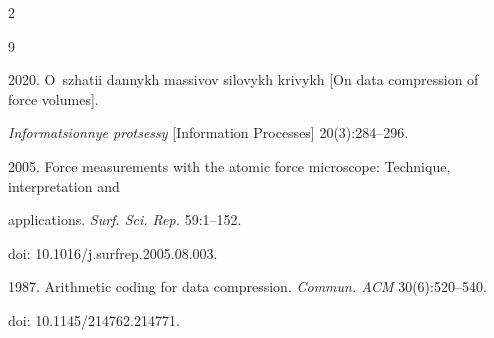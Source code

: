 















  \begin{multicols}{2}



\renewcommand{\bibname}{\protect\rmfamily References}




{\small\frenchspacing

 {%


 \begin{thebibliography}{9}



 2020. O~szhatii dannykh massivov silovykh krivykh [On data compression of force volumes]. 

 \textit{Informatsionnye protsessy} [Information Processes] 20(3):284--296. 



 2005. Force measurements with the atomic force microscope: Technique, interpretation and 

 applications. \textit{Surf. Sci. Rep.} 59:1--152.

 doi: 10.1016/j.surfrep.2005.08.003.



 1987. Arithmetic coding for data compression. \textit{Commun. ACM} 30(6):520--540. 

 doi: 10.1145/214762.214771.


\end{thebibliography}}}
\end{multicols}
